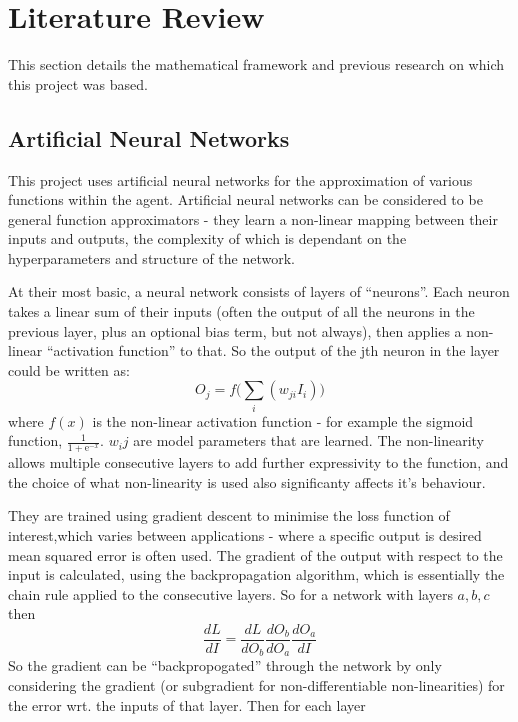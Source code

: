 \section{Literature Review}
This section details the mathematical framework and previous research on which this project was based.

\subsection{Artificial Neural Networks}
This project uses artificial neural networks for the approximation of various functions within the agent. Artificial neural networks can be considered to be general function approximators - they learn a non-linear mapping between their inputs and outputs, the complexity of which is dependant on the hyperparameters and structure of the network.

At their most basic, a neural network consists of layers of ``neurons''. Each neuron takes a linear sum of their inputs (often the output of all the neurons in the previous layer, plus an optional bias term, but not always), then applies a non-linear ``activation function'' to that.  So the output of the jth neuron in the layer could be written as:
\begin{equation}
O_j = f\big( \sum_i (w_{ji}I_i)\big)
\end{equation} where $f(x)$ is the non-linear activation function - for example the sigmoid function, $\frac{1}{1+ \text{e}^{-x}}$.  $w_ij$ are model parameters that are learned. The non-linearity allows multiple consecutive layers to add further expressivity to the function, and the choice of what non-linearity is used also significanty affects it's behaviour.

They are trained using gradient descent to minimise the loss function of interest,which varies between applications - where a specific output is desired mean squared error is often used. The gradient of the output with respect to the input is calculated, using the backpropagation algorithm, which is essentially the chain rule applied to the consecutive layers. So for a network with layers $a, b, c$ then 
\begin{equation}
\frac{dL}{dI}  = \frac{dL}{dO_b} \frac{dO_b}{dO_a} \frac{dO_a}{dI} 
\end{equation}
So the gradient can be ``backpropogated'' through the network by only considering the gradient (or subgradient for non-differentiable non-linearities) for the error wrt. the inputs of that layer. Then for each layer %

